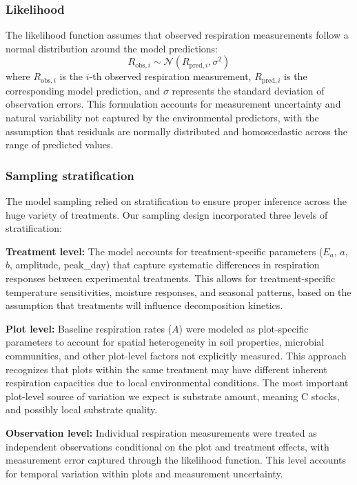 \documentclass[12pt,a4paper]{article}
\begin{document}
\subsubsection{Likelihood}
The likelihood function assumes that observed respiration measurements follow a normal distribution around the model predictions:
\begin{equation}
R_{\text{obs},i} \sim \mathcal{N}(R_{\text{pred},i}, \sigma^2)
\end{equation}
where $R_{\text{obs},i}$ is the $i$-th observed respiration measurement, $R_{\text{pred},i}$ is the corresponding model prediction, and $\sigma$ represents the standard deviation of observation errors. This formulation accounts for measurement uncertainty and natural variability not captured by the environmental predictors, with the assumption that residuals are normally distributed and homoscedastic across the range of predicted values.

\subsubsection{Sampling stratification}
The model sampling relied on stratification to ensure proper inference across the huge variety of treatments. Our sampling design incorporated three levels of stratification:

\textbf{Treatment level:} The model accounts for treatment-specific parameters ($E_a$, $a$, $b$, amplitude, peak\_day) that capture systematic differences in respiration responses between experimental treatments. This allows for treatment-specific temperature sensitivities, moisture responses, and seasonal patterns, based on the assumption that treatments will influence decomposition kinetics.

\textbf{Plot level:} Baseline respiration rates ($A$) were modeled as plot-specific parameters to account for spatial heterogeneity in soil properties, microbial communities, and other plot-level factors not explicitly measured. This approach recognizes that plots within the same treatment may have different inherent respiration capacities due to local environmental conditions. The most important plot-level source of variation we expect is substrate amount, meaning C stocks, and possibly local substrate quality.

\textbf{Observation level:} Individual respiration measurements were treated as independent observations conditional on the plot and treatment effects, with measurement error captured through the likelihood function. This level accounts for temporal variation within plots and measurement uncertainty.
\end{document}

